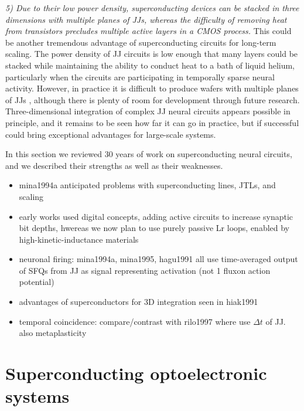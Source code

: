 \documentclass[twocolumn]{article}
\begin{document}
\vspace{1em}
\textit{5) Due to their low power density, superconducting devices can be stacked in three dimensions with multiple planes of JJs, whereas the difficulty of removing heat from transistors precludes multiple active layers in a CMOS process.} \newline This could be another tremendous advantage of superconducting circuits for long-term scaling. The power density of JJ circuits is low enough that many layers could be stacked while maintaining the ability to conduct heat to a bath of liquid helium, particularly when the circuits are participating in temporally sparse neural activity. However, in practice it is difficult to produce wafers with multiple planes of JJs \cite{to2016}, although there is plenty of room for development through future research. Three-dimensional integration of complex JJ neural circuits appears possible in principle, and it remains to be seen how far it can go in practice, but if successful could bring exceptional advantages for large-scale systems.

\vspace{1em}
In this section we reviewed 30 years of work on superconducting neural circuits, and we described their strengths as well as their weaknesses. 

\vspace{1em}
\begin{itemize}
\item mina1994a anticipated problems with superconducting lines, JTLs, and scaling
\item early works used digital concepts, adding active circuits to increase synaptic bit depths, hwereas we now plan to use purely passive Lr loops, enabled by high-kinetic-inductance materials
\item neuronal firing: mina1994a, mina1995, hagu1991 all use time-averaged output of SFQs from JJ as signal representing activation (not 1 fluxon action potential)
\item advantages of superconductors for 3D integration seen in hiak1991
\item temporal coincidence: compare/contrast with rilo1997 where use $\Delta t$ of JJ. also metaplasticity
\end{itemize}

\section{\label{sec:superconductingOptoelectronic}Superconducting optoelectronic systems}
\end{document}
